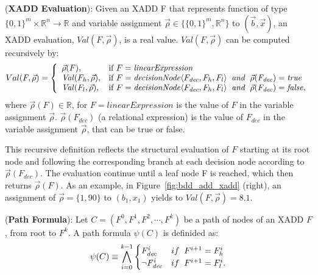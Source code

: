 \documentclass[twoside,11pt]{article}
\newenvironment{mydef}[1][Definition]{\begin{trivlist}
\item[\hskip \labelsep {\bfseries #1}]}{\end{trivlist}}
\begin{document}
\begin{mydef}(\textbf{XADD Evaluation}):
Given an XADD F  that represents function of type $\lbrace 0,1 \rbrace^m \times \mathbb{R}^{n} \rightarrow \mathbb{R}$ and variable assignment $\vec{\rho} \in \lbrace \lbrace0,1 \rbrace^m,\mathbb{R}^n \rbrace$ to $(\vec{b},\vec{x})$, an XADD evaluation,  
$ Val(F,\vec{\rho})$, is a real value.  $ Val(F,\vec{\rho})$ can be computed recursively by:
\begin{equation*}
Val(F,\vec{\rho}) = \left\{
\begin{array}{lll}
\vec{\rho}(\mathit{F}),  &\textrm{if } F=\mathit{linearExpression}\\
\mathit{Val} (F_h,\vec{\rho}), &\textrm{if } F = \mathit{decisionNode} \langle F_{\mathit{dec}}, F_h, F_l \rangle \hspace{2mm}  \mathit{and} \hspace{2mm} \vec{\rho}(\mathit{F_{dec}})=\mathit{true}\\
 \mathit{Val} (F_l,\vec{\rho}), &\textrm{if } F = \mathit{decisionNode} \langle F_{\mathit{dec}}, F_h, F_l \rangle \hspace{2mm}  \mathit{and}  \hspace{2mm} \vec{\rho}(\mathit{F_{dec}})=\mathit{false},\\
\end{array} \right. 
\end{equation*}
where $\vec{\rho}(\mathit{F}) \in \mathbb{R}$, for $ F=\mathit{linearExpression}$ is the value of $F$ in the variable assignment $\vec{\rho}$. $\vec{\rho}(\mathit{F_{dec}})$  (a relational expression) is the value of $\mathit{F_{dec}}$  in the variable assignment $\vec{\rho}$, that can be true or false.


This recursive definition reflects the structural
evaluation of $F$ starting at its root node and following
the corresponding branch at each decision node according to $\vec{\rho}(F_\mathit{dec})$.
The evaluation continue until a leaf node F is reached,
which then returns $\vec{\rho}(\mathit{F})$. As an example, in Figure~\ref{fig:bdd_add_xadd} (right), an assignment of $\vec{\rho} = \lbrace 1, 90\rbrace$ to $(b_1,x_1)$ yields to $Val(F,\vec{\rho})=8.1$.
\end{mydef}

\begin{mydef}(\textbf{Path Formula}):
Let $C=(F^0,F^1,F^2 , \cdots, F^{\mathit{k}})$ be a path of nodes of an XADD $F$, from root to $F^k$. A path formula $\psi(C)$ is definided as:
\begin{equation}
\psi(C) \equiv \bigwedge_{i=0}^{\mathit{k}-1}
\begin{cases}
 \mathit{F^i_{dec}} & if \hspace{2mm}  F^{i+1}= F^i_h\\ 
 \neg \mathit{F^i_{dec}} & if \hspace{2mm} F^{i+1}=F^i_l. \\ 
\end{cases} \label{eq:path}%
\end{equation}
\end{mydef}
\end{document}
